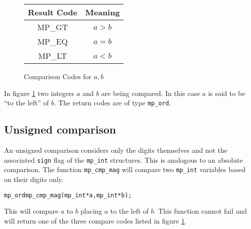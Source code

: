 \documentclass[synpaper]{book}
\begin{document}
  
\begin{figure}[h]
  \begin{center}
    \begin{tabular}{|c|c|}
      \hline \textbf{Result Code} & \textbf{Meaning} \\
      \hline MP\_GT               & $a > b$          \\
      \hline MP\_EQ               & $a = b$          \\
      \hline MP\_LT               & $a < b$          \\
      \hline
    \end{tabular}
  \end{center}
  \caption{Comparison Codes for $a, b$}
  \label{fig:CMP}
\end{figure}

In figure \ref{fig:CMP} two integers $a$ and $b$ are being compared.  In this case $a$ is said to
be ``to the left'' of $b$. The return codes are of type \texttt{mp\_ord}.

\subsection{Unsigned comparison}

An unsigned comparison considers only the digits themselves and not the associated \texttt{sign}
flag of the \texttt{mp\_int} structures.  This is analogous to an absolute comparison.  The
function \texttt{mp\_cmp\_mag} will compare two \texttt{mp\_int} variables based on their digits
only.

\begin{alltt}
mp_ord mp_cmp_mag(mp_int *a, mp_int *b);
\end{alltt}
This will compare $a$ to $b$ placing $a$ to the left of $b$.  This function cannot fail and will
return one of the three compare codes listed in figure \ref{fig:CMP}.
\end{document}
